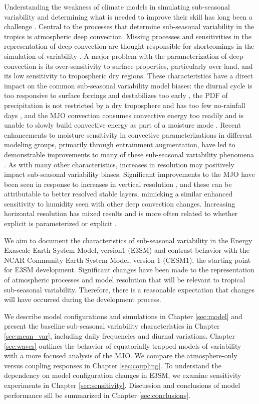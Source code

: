 \documentclass[draft,ms]{AGUTeX}
\begin{document}
\begin{article}
Understanding the weakness of climate models in simulating sub-seasonal variability and determining what is needed to improve their skill has long been a challenge \citep{Zhang2013}. Central to the processes that determine sub-seasonal variability in the tropics is atmospheric deep convection. Missing processes and sensitivities in the representation of deep convection are thought responsible for shortcomings in the simulation of variability \citep{Kim2014}. A major problem with the parameterization of deep convection is its over-sensitivity to surface properties, particularly over land, and its low sensitivity to tropospheric dry regions. These characteristics have a direct impact on the common sub-seasonal variability model biases: the diurnal cycle is too responsive to surface forcings and destabilizes too early \citep{Yuan2013}, the PDF of precipitation is not restricted by a dry troposphere and has too few no-rainfall days \citep{Hirota2014}, and the MJO convection consumes convective energy too readily and is unable to slowly build convective energy as part of a moisture mode \citep{Kim2014}. Recent enhancements to moisture sensitivity in convective parameterizations in different modeling groups, primarily through entrainment augmentation, have led to demonstrable improvements to many of these sub-seasonal variability phenomena \citep[e.g.,][]{Neale2008,Zhou2012,Tokioka1988,Oueslati2013}. As with many other characteristics, increases in resolution may positively impact sub-seasonal variability biases. Significant improvements to the MJO have been seen in response to increases in vertical resolution \citep{Inness2001a}, and these can be attributable to better resolved stable layers, mimicking a similar enhanced sensitivity to humidity seen with other deep convection changes. Increasing horizontal resolution has mixed results \citep[e.g.,][]{Jia2008} and is more often related to whether explicit is parameterized or explicit \citep{Holloway2013}.

We aim to document the characteristics of sub-seasonal variability in the Energy Exascale Earth System Model, version1 (E3SM) and contrast behavior with the NCAR Community Earth System Model, version 1 (CESM1), the starting point for E3SM development. Significant changes have been made to the representation of atmospheric processes and model resolution that will be relevant to tropical sub-seasonal variability. Therefore, there is a reasonable expectation that changes will have occurred during the development process.

We describe model configurations and simulations in Chapter \ref{sec:model} and present the baseline sub-seasonal variability characteristics in Chapter \ref{sec:mean_var}, including daily frequencies and diurnal variations. Chapter \ref{sec:waves} outlines the behavior of equatorially trapped models of variability with a more focused analysis of the MJO. We compare the atmosphere-only versus coupling responses in Chapter \ref{sec:coupling}. To understand the dependency on model configuration changes in E3SM, we examine sensitivity experiments in Chapter \ref{sec:sensitivity}. Discussion and conclusions of model performance sill be summarized in Chapter \ref{sec:conclusions}.




\end{article}
\end{document}
